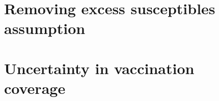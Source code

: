 \appendix

\section{Removing excess susceptibles assumption}

\section{Uncertainty in vaccination coverage}